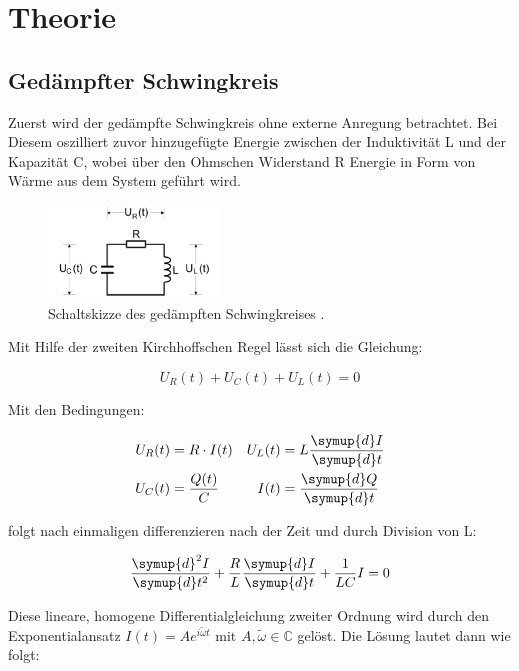 \section{Theorie}
\label{sec:Theorie}

\subsection{Gedämpfter Schwingkreis}
\label{sec:Theorie_1}

Zuerst wird der gedämpfte Schwingkreis ohne externe Anregung betrachtet. 
Bei Diesem oszilliert zuvor hinzugefügte Energie zwischen der Induktivität L und der Kapazität C,
wobei über den Ohmschen Widerstand R Energie in Form von Wärme aus dem System geführt wird.

\begin{figure}
	\centering
    \includegraphics[width=0.4\textwidth]{content/RLC.pdf}
	\caption{Schaltskizze des gedämpften Schwingkreises \cite{v354}.}
	\label{fig:RLC}
\end{figure}

Mit Hilfe der zweiten Kirchhoffschen Regel lässt sich die Gleichung:

\begin{equation}
    \label{eqn:RLC1}
    U_R(t) + U_C(t) + U_L(t) = 0
\end{equation}

Mit den Bedingungen:

\begin{align}
    \label{eqn:RLC_relations}
        U_R(t) &= R \cdot I(t) & U_L(t) &= L \frac{\symup{d}I}{\symup{d}t} \nonumber \\
        U_C(t) &= \frac{Q(t)}{C} & I(t) &= \frac{\symup{d}Q}{\symup{d}t} 
\end{align}

folgt nach einmaligen differenzieren nach der Zeit und durch Division von L:

\begin{equation}
    \label{eqn:RLC_dgl}
    \frac{\symup{d}^{2}I}{\symup{d}t^2} + \frac{R}{L}\frac{\symup{d}I}{\symup{d}t} + \frac{1}{LC}I = 0   
\end{equation}

Diese lineare, homogene Differentialgleichung zweiter Ordnung wird durch den Exponentialansatz 
$I(t) = A e^{i\tilde{\omega} t} \text{ mit } A, \tilde{\omega} \in \mathbb{C}$ gelöst. Die Lösung lautet dann wie folgt:

